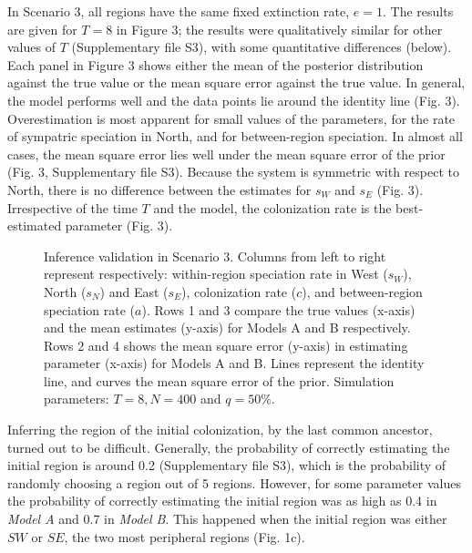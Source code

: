 In Scenario 3, all regions have the same fixed extinction rate, $e = 1$. 
The results are given for $T=8$ in Figure 3; the results were qualitatively similar for other values of $T$ (Supplementary file S3), with some quantitative differences (below).  
Each panel in Figure 3 shows either the mean of the posterior distribution against the true value or the mean square error against the true value. 
In general, the model performs well and the data points lie around the identity line (Fig. 3). 
Overestimation is most apparent for small values of the parameters, for the rate of sympatric speciation in North, and for between-region speciation. 
In almost all cases, the mean square error lies well under the mean square error of the prior (Fig. 3, Supplementary file S3). 
Because the system is symmetric with respect to North, there is no difference between the estimates for $s_W$ and $s_E$ (Fig. 3). 
Irrespective of the time $T$ and the model, the colonization rate is the best-estimated parameter (Fig. 3). 
%
\begin{figure*}[t]
\begin{center}
\caption{Inference validation in Scenario 3. 
	Columns from left to right represent respectively: within-region speciation rate in West ($s_W$), North ($s_N$) and East 				($s_E$), colonization rate ($c$), and between-region speciation rate ($a$). 
	Rows 1 and 3 compare the true values (x-axis) and the mean estimates (y-axis) for Models A and B respectively. 
	Rows 2 and 4 shows the mean square error (y-axis) in estimating parameter (x-axis) for Models A and B. 
	Lines represent the identity line, and curves the mean square error of the prior. Simulation parameters: $T = 8, N = 400$ and $q = 50\%$.}
\label{fig:3}
\vspace{-0.2in}
\end{center}
\end{figure*}
 
Inferring the region of the initial colonization, by the last common ancestor, turned out to be difficult. 
Generally, the probability of correctly estimating the initial region is around 0.2 (Supplementary file S3), which is the probability of randomly choosing a region out of 5 regions. 
However, for some parameter values the probability of correctly estimating the initial region was as high as 0.4 in \textit{Model A} and 0.7 in \textit{Model B}. 
This happened when the initial region was either $SW$ or $SE$, the two most peripheral regions (Fig. 1c).   

